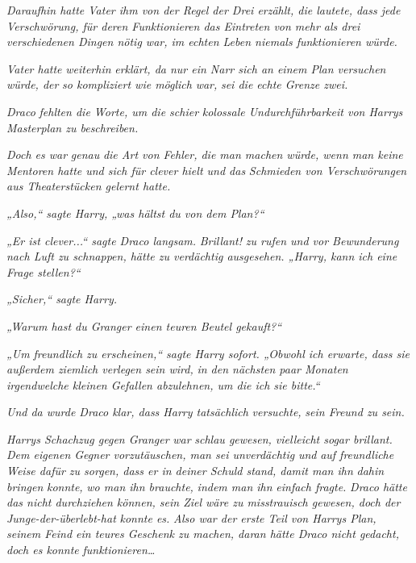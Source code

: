 {\emph{Daraufhin hatte Vater ihm von der Regel der Drei erzählt, die lautete, dass jede} \emph{Verschwörung, für deren Funktionieren das Eintreten von mehr als drei verschiedenen Dingen nötig war, im echten Leben niemals funktionieren würde.}

\emph{Vater hatte} \emph{\emph{weiterhin}} \emph{erklärt, da nur ein Narr sich an einem Plan versuchen würde, der} \emph{\emph{so kompliziert wie möglich}} \emph{war,} \emph{sei die echte Grenze zwei.}

\emph{Draco} \emph{fehlten die Worte, um die schier} \emph{kolossale Undurchführbarkeit von Harrys Masterplan zu beschreiben.}

\emph{Doch es war} \emph{\emph{genau}} \emph{die Art von Fehler, die man machen würde, wenn man keine Mentoren hatte und sich für clever hielt und das} \emph{Schmieden von Verschwörungen aus Theaterstücken gelernt hatte.}

\emph{„Also,“ sagte Harry, „was hältst du von dem Plan?“}

\emph{„Er ist clever...“ sagte Draco langsam.} \emph{\emph{Brillant!}} \emph{zu rufen und vor Bewunderung nach Luft zu schnappen, hätte zu verdächtig ausgesehen. „Harry, kann ich eine Frage stellen?“}

\emph{„Sicher,“ sagte Harry.}

\emph{„Warum hast du Granger einen teuren Beutel gekauft?“}

\emph{„Um} \emph{freundlich zu erscheinen,“ sagte Harry sofort. „Obwohl ich erwarte, dass sie außerdem ziemlich verlegen sein wird,} \emph{in den nächsten paar Monaten irgendwelche kleinen Gefallen abzulehnen, um die ich sie bitte.“}

\emph{Und da wurde Draco klar, dass Harry tatsächlich} \emph{\emph{versuchte,}} \emph{sein Freund zu sein.}

\emph{Harrys Schachzug gegen Granger} \emph{\emph{war}} \emph{schlau gewesen, vielleicht sogar brillant. Dem eigenen Gegner vorzutäuschen, man sei unverdächtig} \emph{\emph{und}} \emph{auf freundliche} \emph{Weise dafür zu sorgen, dass er in deiner Schuld stand, damit man ihn} \emph{dahin bringen} \emph{konnte,} \emph{wo man ihn brauchte,} \emph{\emph{indem man ihn}} \emph{\emph{einfach fragte.}} \emph{Draco hätte das nicht durchziehen können, sein Ziel wäre zu misstrauisch gewesen, doch der Junge-der-überlebt-hat} \emph{\emph{konnte es.}} \emph{Also war der erste Teil von Harrys Plan, seinem Feind ein teures Geschenk zu machen, daran hätte Draco nicht gedacht, doch es konnte} \emph{\emph{funktionieren…}}

}
